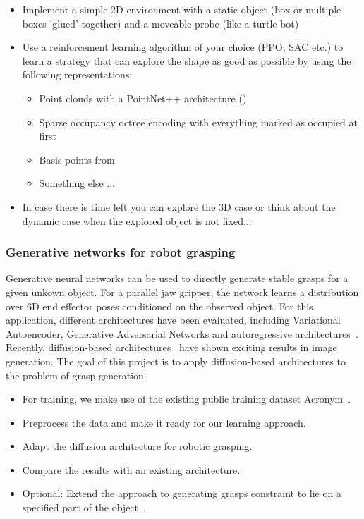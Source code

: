 \documentclass[a4paper]{article}
\begin{document}
\begin{itemize}
  \item Implement a simple 2D environment with a static object (box or multiple boxes 'glued' together) and a moveable probe (like a turtle bot)
  \item Use a reinforcement learning algorithm of your choice (PPO, SAC etc.) to learn a strategy that can explore the shape as good as possible by using the following representations:
  \begin{itemize}
    \item Point clouds with a PointNet++ architecture (\citet{NIPS2017_d8bf84be})
    \item Sparse occupancy octree encoding with everything marked as occupied at first
    \item Basis points from ~\citet{Prokudin2019}
    \item Something else ...
  \end{itemize}
  \item In case there is time left you can explore the 3D case or think about the dynamic case when the explored object is not fixed...
\end{itemize}

\subsubsection{Generative networks for robot grasping}

Generative neural networks can be used to directly generate stable grasps for a given unkown object.
For a parallel jaw gripper, the network learns a distribution over 6D end effector poses conditioned on the observed object.
For this application, different architectures have been evaluated, including Variational Autoencoder, Generative Adversarial Networks and autoregressive architectures~\citet{winkelbauer2022}.
Recently, diffusion-based architectures~\cite{ho2020denoising} have shown exciting results in image generation.
The goal of this project is to apply diffusion-based architectures to the problem of grasp generation.

\begin{itemize}
  \item For training, we make use of the existing public training dataset Acronym~\cite{acronym2020}.
  \item Preprocess the data and make it ready for our learning approach.
  \item Adapt the diffusion architecture for robotic grasping.
  \item Compare the results with an existing architecture.
  \item Optional: Extend the approach to generating grasps constraint to lie on a specified part of the object~\cite{lundell2023constrained}.
\end{itemize}
\end{document}

